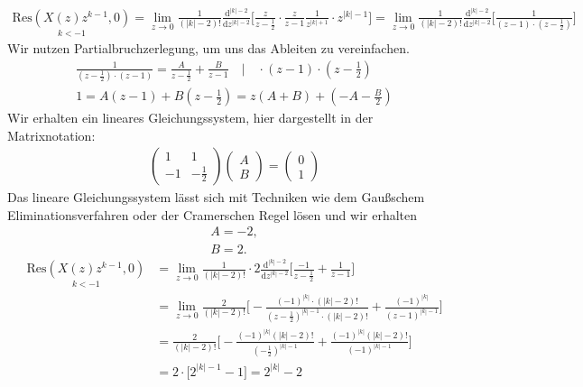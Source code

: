 \documentclass[11pt,a4paper,DIV=12]{scrartcl}
\begin{document}
\begin{align}
	\underset{k<-1}{\mathrm{Res}(X(z)z^{k-1},0)}=\lim\limits_{z\rightarrow0}\frac{1}{(|k|-2)!}\frac{\mathrm{d}^{|k|-2}}{\mathrm{d}z^{|k|-2}}\Bigg [\frac{z}{z-\frac{1}{2}}\cdot\frac{z}{z-1}\frac{1}{z^{|k|+1}}\cdot z^{|k|-1}\Bigg]=\lim\limits_{z\rightarrow0}\frac{1}{(|k|-2)!}\frac{\mathrm{d}^{|k|-2}}{\mathrm{d}z^{|k|-2}}\Bigg [\frac{1}{(z-1)\cdot(z-\frac{1}{2})}\Bigg]
\end{align}
Wir nutzen Partialbruchzerlegung, um uns das Ableiten zu vereinfachen.
\begin{align}
	\frac{1}{(z-\frac{1}{2})\cdot(z-1)}=\frac{A}{z-\frac{1}{2}}+\frac{B}{z-1}\quad \Bigg | \quad \cdot(z-1)\cdot(z-\frac{1}{2}) \nonumber \\
	1 = A(z-1)+B(z-\frac{1}{2})=z(A+B)+(-A-\frac{B}{2})
\end{align}
Wir erhalten ein lineares Gleichungssystem, hier dargestellt in der Matrixnotation:
\begin{align}
	\begin{pmatrix}
		1 & 1 \\
		-1 & -\frac{1}{2}
	\end{pmatrix}
	\begin{pmatrix}
		A \\
		B
	\end{pmatrix}
	=
	\begin{pmatrix}
		0 \\
		1
	\end{pmatrix}
\end{align}
Das lineare Gleichungssystem lässt sich mit Techniken wie dem Gaußschem Eliminationsverfahren oder der Cramerschen Regel lösen und wir erhalten
\begin{align}
	A = -2, \nonumber \\
	B = 2.
\end{align}
\begin{align}
	\underset{k<-1}{\mathrm{Res}(X(z)z^{k-1},0)}&=\lim\limits_{z\rightarrow0}\frac{1}{(|k|-2)!}\cdot2\frac{\mathrm{d}^{|k|-2}}{\mathrm{d}z^{|k|-2}}\Bigg [\frac{-1}{z-\frac{1}{2}}+\frac{1}{z-1}\Bigg]\nonumber \\
	&=\lim\limits_{z\rightarrow0}\frac{2}{(|k|-2)!}\Bigg [-\frac{(-1)^{|k|}\cdot(|k|-2)!}{(z-\frac{1}{2})^{|k|-1}\cdot(|k|-2)!}+\frac{(-1)^{|k|}}{(z-1)^{|k|-1}}\Bigg] \nonumber \\
	&=\frac{2}{(|k|-2)!}\Bigg [-\frac{(-1)^{|k|}(|k|-2)!}{(-\frac{1}{2})^{|k|-1}}+\frac{(-1)^{|k|}(|k|-2)!}{(-1)^{|k|-1}}\Bigg] \nonumber \\
	&=2\cdot \Bigg [2^{|k|-1}-1\Bigg]=2^{|k|}-2
\end{align}
\end{document}
